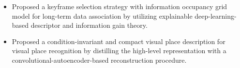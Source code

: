 \documentclass[12pt,a4paper,sans]{moderncv} %
\newcommand\Colorhref[3][orange]{\href{#2}{\small\color{#1}#3}}
\begin{document}
{
  \begin{itemize}
    \item Proposed a keyframe selection strategy with information occupancy grid model for long-term data association by utilizing explainable deep-learning-based descriptor and information gain theory.
    \item Proposed a condition-invariant and compact visual place description for visual place recognition by distilling the high-level representation with a convolutional-autoencoder-based reconstruction procedure.
  \end{itemize}
}






\end{document}
